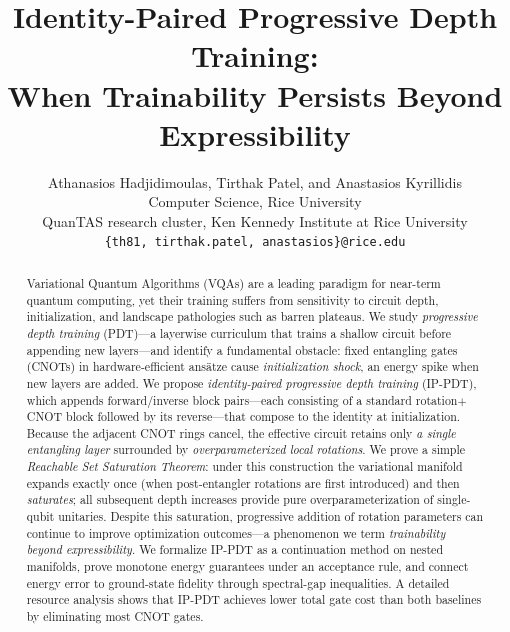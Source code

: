 \documentclass[11pt]{article}
\title{%
  Identity-Paired Progressive Depth Training:\\
  When Trainability Persists Beyond Expressibility%
}
\author{%
  Athanasios Hadjidimoulas, Tirthak Patel, and Anastasios Kyrillidis\\
  Computer Science, Rice University \\ 
  QuanTAS research cluster, Ken Kennedy Institute at Rice University\\
  \texttt{\{th81, tirthak.patel, anastasios\}@rice.edu}
}
\date{}
\theoremstyle{plain}
\theoremstyle{plain}
\begin{document}
\maketitle
\begin{abstract}
Variational Quantum Algorithms (VQAs) are a leading paradigm for
near-term quantum computing, yet their training suffers from
sensitivity to circuit depth, initialization, and landscape pathologies
such as barren plateaus.  We study \emph{progressive depth training}
(PDT)---a layerwise curriculum that trains a shallow circuit before
appending new layers---and identify a fundamental obstacle: fixed
entangling gates (CNOTs) in hardware-efficient ans\"atze cause
\emph{initialization shock}, an energy spike when new layers are
added.  We propose \emph{identity-paired progressive depth training}
(IP-PDT), which appends forward/inverse block pairs---each consisting
of a standard rotation$+$CNOT block followed by its reverse---that
compose to the identity at initialization.  Because the adjacent CNOT
rings cancel, the effective circuit retains only \textit{a single
entangling layer} surrounded by \textit{overparameterized local
rotations}.  We prove a simple \textit{Reachable Set Saturation Theorem}:
under this construction the variational manifold expands exactly once
(when post-entangler rotations are first introduced) and then
\emph{saturates}; all subsequent depth increases provide pure
overparameterization of single-qubit unitaries.  Despite this
saturation, progressive addition of rotation parameters can continue to
improve optimization outcomes---a phenomenon we term
\emph{trainability beyond expressibility}.  We formalize IP-PDT as a
continuation method on nested manifolds, prove monotone energy
guarantees under an acceptance rule, and connect energy error to
ground-state fidelity through spectral-gap inequalities.
A detailed resource analysis shows that IP-PDT achieves lower total gate cost
than both baselines by eliminating most CNOT gates.  


\end{abstract}
\end{document}
